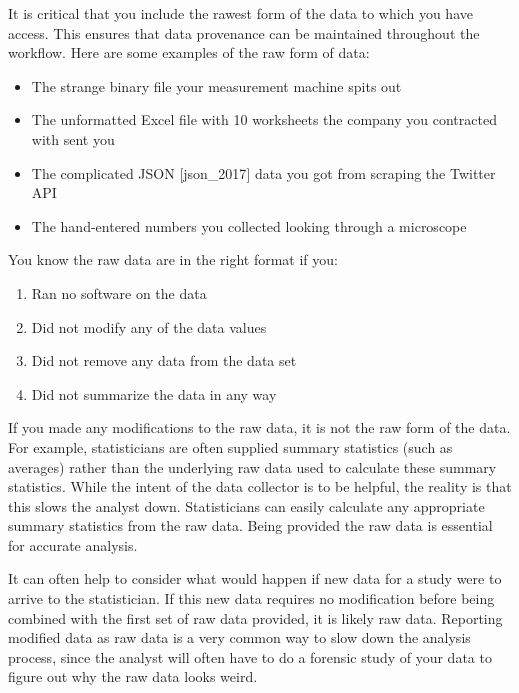 \documentclass[12pt]{article}
\providecommand{\tightlist}{%
  \setlength{\itemsep}{0pt}\setlength{\parskip}{0pt}}
\begin{document}
It is critical that you include the rawest form of the data to which you
have access. This ensures that data provenance can be maintained
throughout the workflow. Here are some examples of the raw form of data:

\begin{itemize}
\tightlist
\item
  The strange binary file \citep{_binary_2017} your measurement machine
  spits out
\item
  The unformatted Excel file with 10 worksheets the company you
  contracted with sent you
\item
  The complicated JSON {[}json\_2017{]} data you got from scraping the
  Twitter API \citep{noauthor_twitter_nodate}
\item
  The hand-entered numbers you collected looking through a microscope
\end{itemize}

You know the raw data are in the right format if you:

\begin{enumerate}
\def\labelenumi{\arabic{enumi}.}
\tightlist
\item
  Ran no software on the data
\item
  Did not modify any of the data values
\item
  Did not remove any data from the data set
\item
  Did not summarize the data in any way
\end{enumerate}

If you made any modifications to the raw data, it is not the raw form of
the data. For example, statisticians are often supplied summary
statistics (such as averages) rather than the underlying raw data used
to calculate these summary statistics. While the intent of the data
collector is to be helpful, the reality is that this slows the analyst
down. Statisticians can easily calculate any appropriate summary
statistics from the raw data. Being provided the raw data is essential
for accurate analysis.

It can often help to consider what would happen if new data for a study
were to arrive to the statistician. If this new data requires no
modification before being combined with the first set of raw data
provided, it is likely raw data. Reporting modified data as raw data is
a very common way to slow down the analysis process, since the analyst
will often have to do a forensic study of your data to figure out why
the raw data looks weird.
\end{document}
